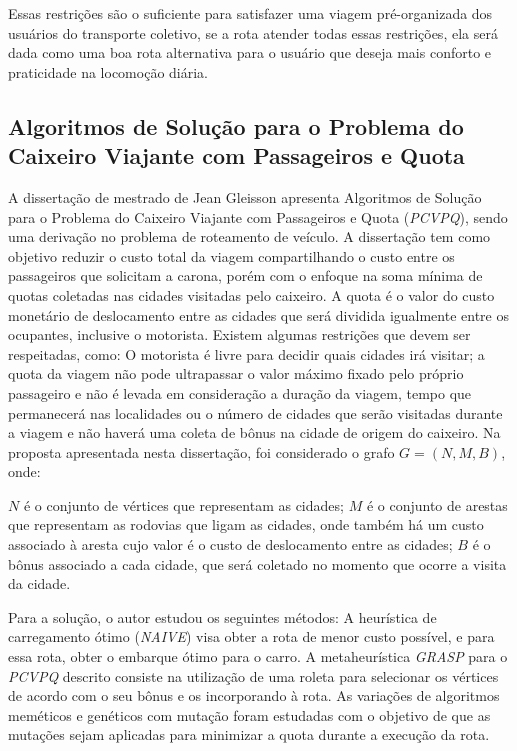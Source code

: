 Essas restrições são o suficiente para satisfazer uma viagem pré-organizada dos usuários do transporte coletivo, se a rota atender todas essas restrições, ela será dada como uma boa rota alternativa para o usuário que deseja mais conforto e praticidade na locomoção diária.

 
 \subsection{Algoritmos de Solução para o Problema do Caixeiro Viajante com Passageiros e Quota \cite{silva2017algoritmos}}
 
A dissertação de mestrado de Jean Gleisson apresenta Algoritmos de Solução para o Problema do Caixeiro Viajante com Passageiros e Quota (\emph{PCVPQ}), sendo uma derivação no problema de roteamento de veículo. A dissertação tem como objetivo reduzir o custo total da viagem compartilhando o custo entre os passageiros que solicitam a carona, porém com o enfoque na soma mínima de quotas coletadas nas cidades visitadas pelo caixeiro. A quota é o valor do custo monetário de deslocamento entre as cidades que será dividida igualmente entre os ocupantes, inclusive o motorista.
Existem algumas restrições que devem ser respeitadas, como: O motorista é livre para decidir quais cidades irá visitar; a quota da viagem não pode ultrapassar o valor máximo fixado pelo próprio passageiro e não é levada em consideração a duração da viagem, tempo que permanecerá nas localidades ou o número de cidades que serão visitadas durante a viagem e não haverá uma coleta de bônus na cidade de origem do caixeiro.
Na proposta apresentada nesta dissertação, foi considerado o grafo $G = (N, M, B)$, onde:

$N$ é o conjunto de vértices que representam as cidades;
$M$ é o conjunto de arestas que representam as rodovias que ligam as cidades, onde também há um custo associado à aresta cujo valor é o custo de deslocamento entre as cidades;
$B$ é o bônus associado a cada cidade, que será coletado no momento que ocorre a visita da cidade.

Para a solução, o autor estudou os seguintes métodos:
A heurística de carregamento ótimo (\emph{NAIVE}) visa obter a rota de menor custo possível, e para essa rota, obter o embarque ótimo para o carro.
A metaheurística \emph{GRASP} para o \emph{PCVPQ} descrito consiste na utilização de uma roleta para selecionar os vértices de acordo com o seu bônus e os incorporando à rota.
As variações de algoritmos meméticos e genéticos com mutação foram estudadas com o objetivo de que as mutações sejam aplicadas para minimizar a quota durante a execução da rota.

